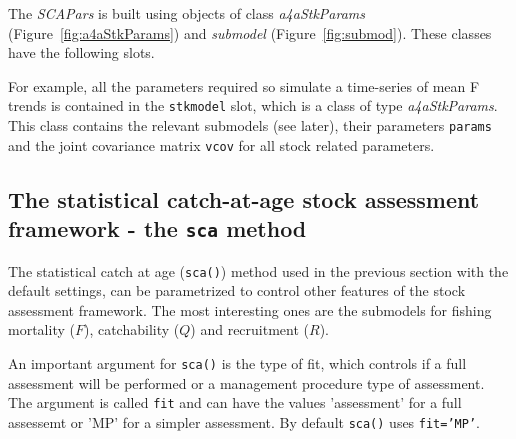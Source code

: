 \documentclass[a4paper,english,10pt]{article}\usepackage[]{graphicx}\usepackage[]{color}
\makeatletter
\newenvironment{kframe}{%
 \def\at@end@of@kframe{}%
 \ifinner\ifhmode%
  \def\at@end@of@kframe{\end{minipage}}%
  \begin{minipage}{\columnwidth}%
 \fi\fi%
 \def\FrameCommand##1{\hskip\@totalleftmargin \hskip-\fboxsep
 \colorbox{shadecolor}{##1}\hskip-\fboxsep
     \hskip-\linewidth \hskip-\@totalleftmargin \hskip\columnwidth}%
 \MakeFramed {\advance\hsize-\width
   \@totalleftmargin\z@ \linewidth\hsize
   \@setminipage}}%
 {\par\unskip\endMakeFramed%
 \at@end@of@kframe}
\newenvironment{knitrout}{}{} %
\newcommand{\code}[1]{{\texttt{#1}}}
\newcommand{\class}[1]{{\textit{#1}}}
\makeatother
\begin{document}
The \class{SCAPars} is built using objects of class \class{a4aStkParams} (Figure~\ref{fig:a4aStkParams}) and \class{submodel} (Figure~\ref{fig:submod}). These classes have the following slots.

\begin{knitrout}
\color{fgcolor}\begin{kframe}


{\ttfamily\noindent\bfseries{}}\end{kframe}
\end{knitrout}

\begin{knitrout}
\color{fgcolor}\begin{kframe}


{\ttfamily\noindent\bfseries{}}\end{kframe}
\end{knitrout}

For example, all the parameters required so simulate a time-series of mean F trends is contained in the \code{stkmodel} slot, which is a class of type \class{a4aStkParams}. This class contains the relevant submodels (see later), their parameters \code{params} and the joint covariance matrix \code{vcov} for all stock related parameters.

\subsection{The statistical catch-at-age stock assessment framework - the \code{sca} method}

The statistical catch at age (\code{sca()}) method used in the previous section with the default settings, can be parametrized to control other features of the stock assessment framework. The most interesting ones are the submodels for fishing mortality ($F$), catchability ($Q$) and recruitment ($R$). 

An important argument for \code{sca()} is the type of fit, which controls if a full assessment will be performed or a management procedure type of assessment. The argument is called \code{fit} and can have the values 'assessment' for a full assessemt or 'MP' for a simpler assessment. By default \code{sca()} uses \code{fit='MP'}. 
\end{document}
